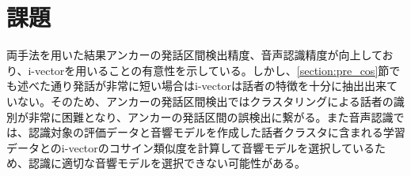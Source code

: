 \section{課題}
両手法を用いた結果アンカーの発話区間検出精度、音声認識精度が向上しており、i-vectorを用いることの有意性を示している。しかし、\ref{section:pre_cos}節でも述べた通り発話が非常に短い場合はi-vectorは話者の特徴を十分に抽出出来ていない。そのため、アンカーの発話区間検出ではクラスタリングによる話者の識別が非常に困難となり、アンカーの発話区間の誤検出に繋がる。また音声認識では、認識対象の評価データと音響モデルを作成した話者クラスタに含まれる学習データとのi-vectorのコサイン類似度を計算して音響モデルを選択しているため、認識に適切な音響モデルを選択できない可能性がある。
